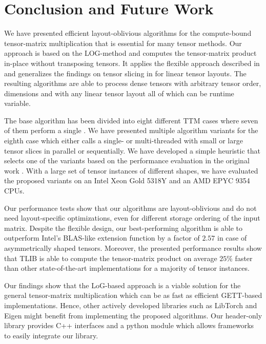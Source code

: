 \section{Conclusion and Future Work}
\label{sec:conclusion}
We have presented efficient layout-oblivious algorithms for the compute-bound tensor-matrix multiplication that is essential for many tensor methods.
Our approach is based on the LOG-method and computes the tensor-matrix product in-place without transposing tensors.
It applies the flexible approach described in \cite{bassoy:2019:ttv} and generalizes the findings on tensor slicing in \cite{li:2015:input} for linear tensor layouts.
The resulting algorithms are able to process dense tensors with arbitrary tensor order, dimensions and with any linear tensor layout all of which can be runtime variable.

The base algorithm has been divided into eight different TTM cases where seven of them perform a single .
We have presented multiple algorithm variants for the eighth case which either calls a single- or multi-threaded  with small or large tensor slices in parallel or sequentially.
We have developed a simple heuristic that selects one of the variants based on the performance evaluation in the original work \cite{bassoy:2024:ttm}.
With a large set of tensor instances of different shapes, we have evaluated the proposed variants on an Intel Xeon Gold 5318Y and an AMD EPYC 9354 CPUs.

Our performance tests show that our algorithms are layout-oblivious and do not need layout-specific optimizations, even for different storage ordering of the input matrix.
Despite the flexible design, our best-performing algorithm is able to outperform Intel's BLAS-like extension function  by a factor of $2.57$ in case of asymmetrically shaped tensors.
Moreover, the presented performance results show that TLIB is able to compute the tensor-matrix product on average $25$\% faster than other state-of-the-art implementations for a majority of tensor instances.

Our findings show that the LoG-based approach is a viable solution for the general tensor-matrix multiplication which can be as fast as efficient GETT-based implementations.
Hence, other actively developed libraries such as LibTorch and Eigen might benefit from implementing the proposed algorithms.
Our header-only library provides C++ interfaces and a python module which allows frameworks to easily integrate our library.

